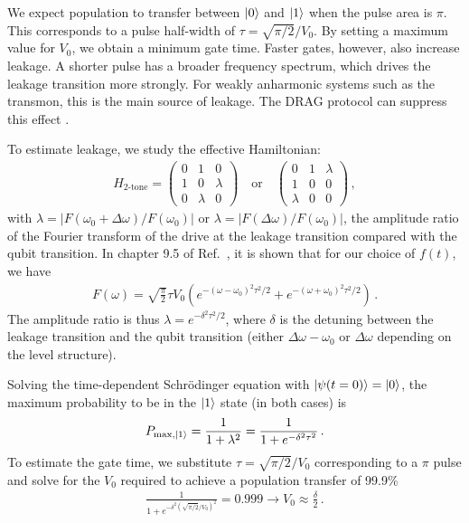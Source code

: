 We expect population to transfer between $\ket{0}$ and $\ket{1}$ when the pulse area is $\pi$. This corresponds to a pulse half-width of $\tau = \sqrt{\pi/2}/V_0$. By setting a maximum value for $V_0$, we obtain a minimum gate time. Faster gates, however, also increase leakage. A shorter pulse has a broader frequency spectrum, which drives the leakage transition more strongly. For weakly anharmonic systems such as the transmon, this is the main source of leakage. The DRAG protocol can suppress this effect \cite{Motzoi_DRAG_2009,Gambetta_DRAG_2009}.


To estimate leakage, we study the effective Hamiltonian:
\begin{align}
    H_\textrm{2-tone} = \begin{pmatrix}
    0 & 1 & 0 \\
    1 & 0 & \lambda \\
    0 & \lambda & 0
\end{pmatrix}\quad
\textrm{or}\quad
\begin{pmatrix}
    0 & 1 & \lambda \\
    1 & 0 & 0 \\
    \lambda & 0 & 0
\end{pmatrix}\, ,
\end{align}
with $\lambda = |F(\omega_0+\Delta\omega)/F(\omega_0)|$ or $\lambda = |F(\Delta\omega)/F(\omega_0)|$, the amplitude ratio of the Fourier transform of the drive at the leakage transition compared with the qubit transition. In chapter 9.5 of  Ref.~\cite{stancil2022principles}, it is shown that for our choice of  $f(t)$, we have
\begin{align}
    F(\omega) = \sqrt{\frac{\pi}{2}}\tau V_0(e^{-(\omega-\omega_0)^2 \tau^2/2} +e^{-(\omega+\omega_0)^2 \tau^2/2}) \, . 
\end{align}
The amplitude ratio is thus $\lambda = e^{-\delta^2 \tau^2/2}$, where $\delta$ is the detuning between the leakage transition and the qubit transition (either $\Delta\omega-\omega_0$ or $\Delta\omega$ depending on the level structure).



Solving the time-dependent Schr\"odinger equation with $\ket{\psi(t=0)} = \ket{0}$, the maximum probability to be in the $\ket{1}$ state (in both cases) is
\begin{align}
    P_{\max,\ket{1}} = \frac{1}{1+\lambda^2} = \frac{1}{1+e^{-\delta^2\tau^2}} \, .
\end{align}
To estimate the gate time, we substitute $\tau = \sqrt{\pi/2}/V_0$ corresponding to a $\pi$ pulse and solve for the $V_0$ required to achieve a population transfer of 99.9\%
\begin{align}
    \frac{1}{1+e^{-\delta^2(\sqrt{\pi/2}/V_0)^2}} = 0.999 \rightarrow V_0 \approx \frac{\delta}{2} \, .
\end{align}

